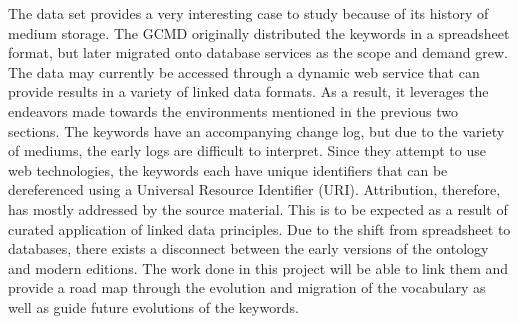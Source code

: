 The data set provides a very interesting case to study because of its history of medium storage.
The GCMD originally distributed the keywords in a spreadsheet format, but later migrated onto database services as the scope and demand grew.
The data may currently be accessed through a dynamic web service that can provide results in a variety of linked data formats.
As a result, it leverages the endeavors made towards the environments mentioned in the previous two sections.
The keywords have an accompanying change log, but due to the variety of mediums, the early logs are difficult to interpret.
Since they attempt to use web technologies, the keywords each have unique identifiers that can be dereferenced using a Universal Resource Identifier (URI).
Attribution, therefore, has mostly addressed by the source material.
This is to be expected as a result of curated application of linked data principles.
Due to the shift from spreadsheet to databases, there exists a disconnect between the early versions of the ontology and modern editions.
The work done in this project will be able to link them and provide a road map through the evolution and migration of the vocabulary as well as guide future evolutions of the keywords.


